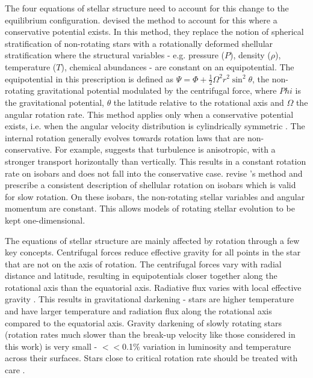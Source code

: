 The four equations of stellar structure need to account for this change to the equilibrium configuration.
\citet{kippenhahn_simple_1970} devised the method to account for this where a conservative potential exists.
In this method, they replace the notion of spherical stratification of non-rotating stars with a rotationally deformed shellular stratification where the structural variables - e.g. pressure ($P$), density ($\rho$), temperature ($T$), chemical abundances - are constant on an equipotential.
The equipotential in this prescription is defined as 
$\Psi = \Phi + \frac{1}{2}\Omega^2 r^2 \sin^2 \theta$, the non-rotating gravitational potential modulated by the centrifugal force, where $Phi$ is the gravitational potential, $\theta$ the latitude relative to the rotational axis and $\Omega$ the angular rotation rate.
This method applies only when a conservative potential exists, i.e. when the angular velocity distribution is cylindrically symmetric \citep{tassoul_theory_1978}.
The internal rotation generally evolves towards rotation laws that are non-conservative.
For example, \citet{zahn_circulation_1992} suggests that turbulence is anisotropic, with a stronger transport horizontally than vertically. 
This results in a constant rotation rate on isobars and does not fall into the conservative case.
\citet{maeder_diffuse_1996} revise \citet{kippenhahn_circulation_1974}'s method and prescribe a consistent description of shellular rotation on isobars which is valid for slow rotation.
On these isobars, the non-rotating stellar variables and angular momentum are constant. 
This allows models of rotating stellar evolution to be kept one-dimensional.

The equations of stellar structure are mainly affected by rotation through a few key concepts.
Centrifugal forces reduce effective gravity for all points in the star that are not on the axis of rotation.
The centrifugal forces vary with radial distance and latitude, resulting in equipotentials closer together along the rotational axis than the equatorial axis.
Radiative flux varies with local effective gravity \citep{von_zeipel_radiative_1924}.
This results in gravitational darkening \citep{von_zeipel_radiative_1924, kippenhahn_rotational_1977} - stars are higher temperature and have larger temperature and radiation flux along the rotational axis compared to the equatorial axis.
Gravity darkening of slowly rotating stars (rotation rates much slower than the break-up velocity like those considered in this work) is very small - $<<$0.1\% variation in luminosity and temperature across their surfaces.
Stars close to critical rotation rate should be treated with care \citep{kippenhahn_rotational_1977,maeder_stellar_1999,heger_presupernova_2000}.

